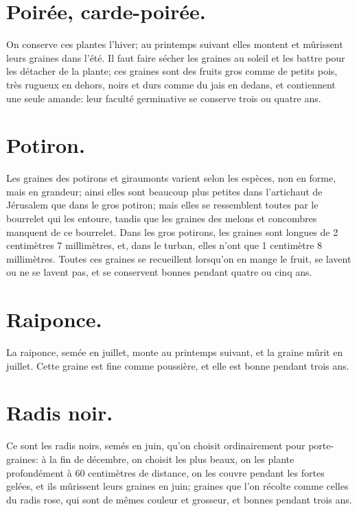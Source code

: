 \documentclass[10pt,a4paper]{book}
\begin{document}
\section{Poirée, carde-poirée.}

On conserve ces plantes l'hiver; au printemps suivant elles montent et mûrissent leurs graines dans l'été. Il faut faire sécher les graines au soleil et les battre pour les détacher de la plante; ces graines sont des fruits gros comme de petits pois, très rugueux en dehors, noirs et durs comme du jais en dedans, et contiennent une seule amande: leur faculté germinative se conserve trois ou quatre ans.

\section{Potiron.}

Les graines des potirons et giraumonts varient selon les espèces, non en forme, mais en grandeur; ainsi elles sont beaucoup plus petites dans l'artichaut de Jérusalem que dans le gros potiron; mais elles se ressemblent toutes par le bourrelet qui les entoure, tandis que les graines des melons et concombres manquent de ce bourrelet. Dans les gros potirons, les graines sont longues de 2 centimètres 7 millimètres, et, dans le turban, elles n'ont que 1 centimètre 8 millimètres. Toutes ces graines se recueillent lorsqu'on en mange le fruit, se lavent ou ne se lavent pas, et se conservent bonnes pendant quatre ou cinq ans.

\section{Raiponce.}

La raiponce, semée en juillet, monte au printemps suivant, et la graine mûrit en juillet. Cette graine est fine comme poussière, et elle est bonne pendant trois ans.

\section{Radis noir.}

Ce sont les radis noirs, semés en juin, qu'on choisit ordinairement pour porte-graines: à la fin de décembre, on choisit les plus beaux, on les plante profondément à 60 centimètres de distance, on les couvre pendant les fortes gelées, et ils mûrissent leurs graines en juin; graines que l'on récolte comme celles du radis rose, qui sont de mêmes couleur et grosseur, et bonnes pendant trois ans.
\end{document}
